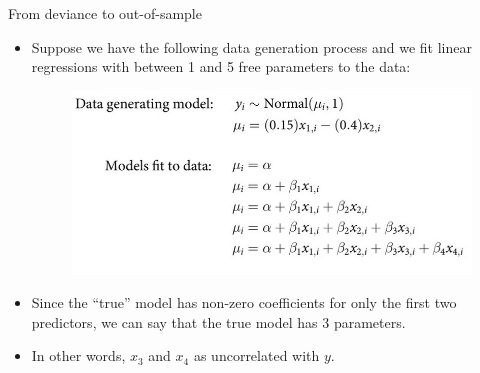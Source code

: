 \documentclass[handout]{beamer}
\begin{document}
\begin{frame}{From deviance to out-of-sample}
\scriptsize{

\begin{itemize}

\item Suppose we have the following data generation process and we fit linear regressions with between 1 and 5 free parameters to the data:

\begin{figure}[h!]
	\centering
	\includegraphics[scale=0.4]{pics/dev_ex.png}
\end{figure}


\item Since the ``true'' model has non-zero coefficients for only the first two predictors, we can say that the true model has 3 parameters.

\item In other words, $x_{3}$ and $x_{4}$ as uncorrelated with $y$.

\end{itemize}


} 
\end{frame}
\end{document}
